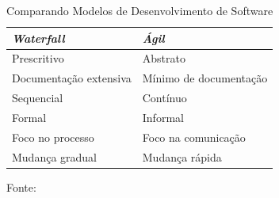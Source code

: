 \begin{table}[ht]
	\caption{Comparando Modelos de Desenvolvimento de Software}
	\label{waterfall_x_agil}
	\ABNTEXfontereduzida
	\begin{tabular}{p{8cm}p{8cm}}
	\toprule
	\textit{Waterfall} & \textit{Ágil}\\
	\midrule
	\ABNTEXfontereduzida
	Prescritivo & Abstrato\\
	Documentação extensiva & Mínimo de documentação\\
	Sequencial & Contínuo\\
	Formal & Informal\\
	Foco no processo & Foco na comunicação\\
	Mudança gradual & Mudança rápida\\
	\bottomrule
	\end{tabular}
	\footnotesize Fonte:
	\cite{KristinRunyan2014}
\end{table}
